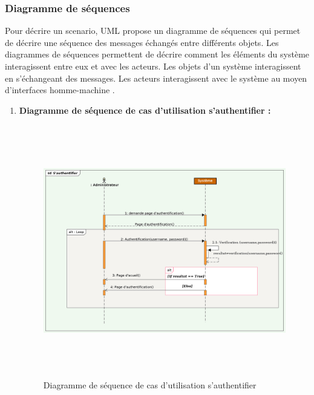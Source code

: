 		\subsubsection{Diagramme de séquences}	
		 Pour décrire un scenario, UML propose un diagramme de séquences qui permet de décrire une séquence des messages échangés entre différents objets. Les diagrammes de séquences permettent de décrire comment les éléments du système interagissent entre eux et avec les acteurs. Les objets d'un système interagissent en s'échangeant des messages. Les acteurs interagissent avec le système au moyen d’interfaces homme-machine\cite{tatiana} .
		 \begin{enumerate}
		 	\item \textbf{Diagramme de séquence de cas d'utilisation s'authentifier :}
		 		\begin{figure}[H]
		 			\centering
		 			\includegraphics[width=17cm, height=11cm]{../Diagrammes/DiagrammeSequences/authentifiers.png}
		 			\caption{Diagramme de séquence de cas d'utilisation s'authentifier}
		 			\label{diaseq1}
		 		\end{figure}
		 		

\end{enumerate}
